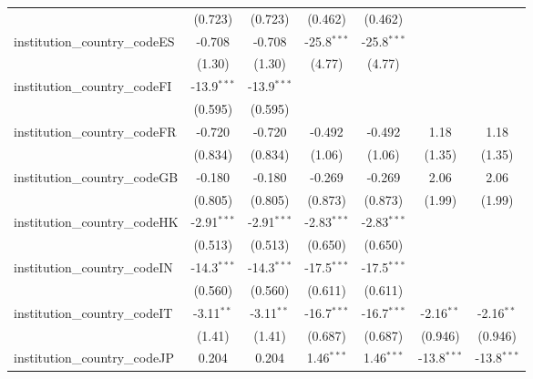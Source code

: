 \begin{tabular}{lcccccc}
                                         & (0.723)       & (0.723)       & (0.462)       & (0.462)       &               &   \\   
   institution\_country\_codeES          & -0.708        & -0.708        & -25.8$^{***}$ & -25.8$^{***}$ &               &   \\   
                                         & (1.30)        & (1.30)        & (4.77)        & (4.77)        &               &   \\   
   institution\_country\_codeFI          & -13.9$^{***}$ & -13.9$^{***}$ &               &               &               &   \\   
                                         & (0.595)       & (0.595)       &               &               &               &   \\   
   institution\_country\_codeFR          & -0.720        & -0.720        & -0.492        & -0.492        & 1.18          & 1.18\\   
                                         & (0.834)       & (0.834)       & (1.06)        & (1.06)        & (1.35)        & (1.35)\\   
   institution\_country\_codeGB          & -0.180        & -0.180        & -0.269        & -0.269        & 2.06          & 2.06\\   
                                         & (0.805)       & (0.805)       & (0.873)       & (0.873)       & (1.99)        & (1.99)\\   
   institution\_country\_codeHK          & -2.91$^{***}$ & -2.91$^{***}$ & -2.83$^{***}$ & -2.83$^{***}$ &               &   \\   
                                         & (0.513)       & (0.513)       & (0.650)       & (0.650)       &               &   \\   
   institution\_country\_codeIN          & -14.3$^{***}$ & -14.3$^{***}$ & -17.5$^{***}$ & -17.5$^{***}$ &               &   \\   
                                         & (0.560)       & (0.560)       & (0.611)       & (0.611)       &               &   \\   
   institution\_country\_codeIT          & -3.11$^{**}$  & -3.11$^{**}$  & -16.7$^{***}$ & -16.7$^{***}$ & -2.16$^{**}$  & -2.16$^{**}$\\   
                                         & (1.41)        & (1.41)        & (0.687)       & (0.687)       & (0.946)       & (0.946)\\   
   institution\_country\_codeJP          & 0.204         & 0.204         & 1.46$^{***}$  & 1.46$^{***}$  & -13.8$^{***}$ & -13.8$^{***}$\\   

\end{tabular}
